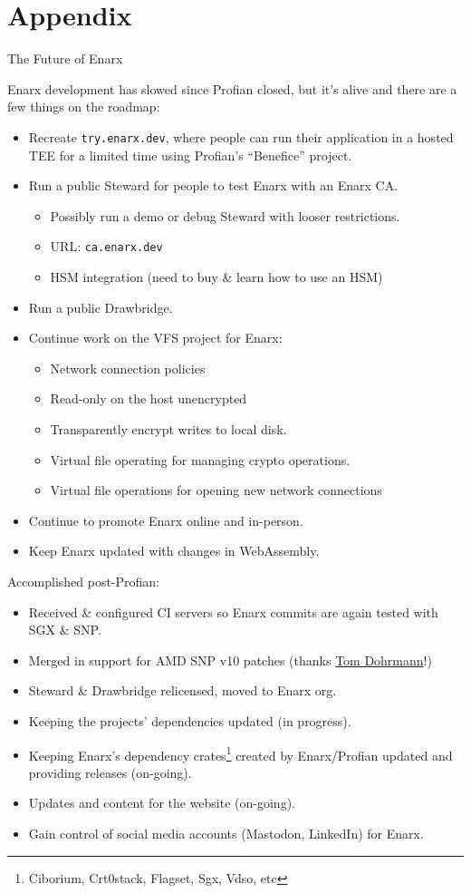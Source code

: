 \documentclass[graphics,compress]{beamer}
\newcommand*\tick{\item[\Checkmark]}
\begin{document}
\section{Appendix}
\begin{frame}{The Future of Enarx}
     {
        Enarx development has slowed since Profian closed, but it's alive and there are a few things on the roadmap:
        \begin{itemize}
            \item Recreate \texttt{try.enarx.dev}, where people can run their application in a hosted TEE for a limited time using Profian's ``Benefice'' project.
            \item Run a public Steward for people to test Enarx with an Enarx CA.
            \begin{itemize}
                \item Possibly run a demo or debug Steward with looser restrictions.
                \item URL: \texttt{ca.enarx.dev}
                \item HSM integration (need to buy \& learn how to use an HSM)
            \end{itemize}
            \item Run a public Drawbridge.
            \item Continue work on the VFS project for Enarx:
            \begin{itemize}
                \item Network connection policies
                \item Read-only on the host unencrypted
                \item Transparently encrypt writes to local disk.
                \item Virtual file operating for managing crypto operations.
                \item Virtual file operations for opening new network connections
            \end{itemize}
            \item Continue to promote Enarx online and in-person.
            \item Keep Enarx updated with changes in WebAssembly.
        \end{itemize}
    }
     {
        Accomplished post-Profian:
        \begin{itemize}
            \tick Received \& configured CI servers so Enarx commits are again tested with SGX \& SNP.
            \tick Merged in support for AMD SNP v10 patches (thanks \href{https://github.com/Freax13}{Tom Dohrmann}!)
            \tick Steward \& Drawbridge relicensed, moved to Enarx org.
            \tick Keeping the projects' dependencies updated (in progress).
            \tick Keeping Enarx's dependency crates\footnote{Ciborium, Crt0stack, Flagset, Sgx, Vdso, etc} created by Enarx/Profian updated and providing releases (on-going).
            \tick Updates and content for the website (on-going).
            \tick Gain control of social media accounts (Mastodon, LinkedIn) for Enarx.
        \end{itemize}
    }
\end{frame}
\end{document}
